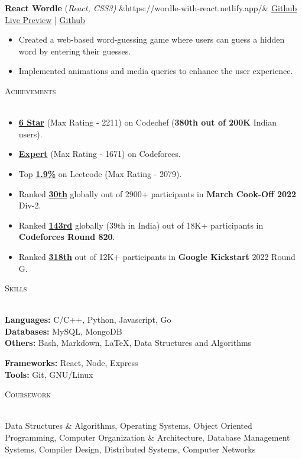 \documentclass[a4paper]{article}
\newcommand{\sectionSep} { \vspace{3mm} }
\newcommand{\lineunder} {
    \vspace*{-8pt} \\
    \hspace*{-15pt} \hrulefill \\
}
\newcommand{\header} [1] {
    {\hspace*{-18pt}\vspace*{6pt} {
        \fontfamily{qcs}\selectfont \large \scshape #1
    }}
    \vspace*{-6pt} \lineunder
    \vspace{0.5mm}
}
\newcommand{\projectItem}[5]{
    {\textbf{#1}} {(\sl #2)}\hfill
    \ifx&#3&%
    \href{#4}{Github}\\
    \else
    \href{#3}{Live Preview} | \href{#4}{Github}\\
    \fi
    \begin{itemize}
        #5
    \end{itemize}
}
\begin{document}
\projectItem{React Wordle}{React, CSS3}{https://wordle-with-react.netlify.app/}{https://github.com/AkshatAggarwal14/react-wordle}{
    \item Created a web-based word-guessing game where users can guess a hidden word by entering their guesses.
    \item Implemented animations and media queries to enhance the user experience.
}
\sectionSep


\header{Achievements}
\begin{itemize}
    \item \textbf{\href{https://www.codechef.com/users/master_mind14}{6 Star}} (Max Rating - 2211) on Codechef (\textbf{380th out of 200K} Indian users).
    \item \textbf{\href{https://codeforces.com/profile/master._.mind}{Expert}} (Max Rating - 1671) on Codeforces.
    \item Top \textbf{\href{https://leetcode.com/AkshatAggarwal14/}{1.9\%}} on Leetcode (Max Rating - 2079).
    \item Ranked \textbf{\href{https://www.codechef.com/rankings/COOK139B?itemsPerPage=100&order=asc&page=1&search=master_mind14&sortBy=rank}{30th}} globally out of 2900+ participants in \textbf{March Cook-Off 2022} Div-2.
    \item Ranked \textbf{\href{https://codeforces.com/contest/1729/standings/participant/140098304\#p140098304}{143rd}} globally (39th in India) out of 18K+ participants in \textbf{Codeforces Round 820}.
    \item Ranked \textbf{\href{https://clist.by/standings/kick-start-round-g-31261744/?find_me=45689030}{318th}} out of 12K+ participants in \textbf{Google Kickstart} 2022 Round G.
\end{itemize}
\sectionSep


\header{Skills}
\begin{minipage}[t]{0.6\textwidth}
    \textbf{Languages:} C/C++, Python, Javascript, Go\\
    \textbf{Databases:} MySQL, MongoDB\\
    \textbf{Others:} Bash, Markdown, \LaTeX, Data Structures and Algorithms
\end{minipage}
\hfill
\begin{minipage}[t]{0.33\textwidth}
    \textbf{Frameworks:} React, Node, Express\\
    \textbf{Tools:} Git, GNU/Linux
\end{minipage}
\sectionSep

\header{Coursework}
Data Structures \& Algorithms,
Operating Systems,
Object Oriented Programming,
Computer Organization \& Architecture,
Database Management Systems,
Compiler Design,
Distributed Systems,
Computer Networks
\end{document}
